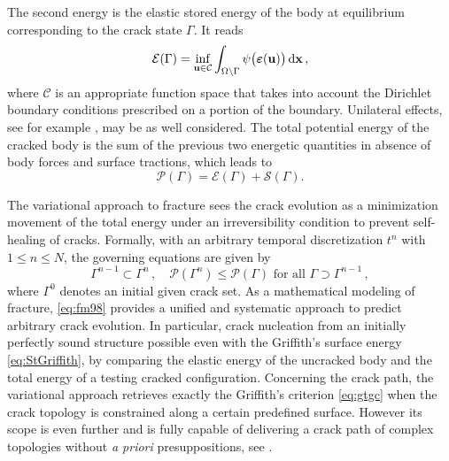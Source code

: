 The second energy is the elastic stored energy of the body at equilibrium corresponding to the crack state $\Gamma$. It reads
\begin{equation} \label{eq:EGamma}
\mathcal{E}(\Gamma)=\inf_{\vec{u}\in\mathcal{C}}\int_{\Omega\setminus\Gamma}\psi\bigl(\eps(\vec{u})\bigr)\dx\,,
\end{equation}
where $\mathcal{C}$ is an appropriate function space that takes into account the Dirichlet boundary conditions prescribed on a portion of the boundary. Unilateral effects, see for example \cite{FrancfortMarigo:1998,AmorMarigoMaurini:2009}, may be as well considered. The total potential energy of the cracked body is the sum of the previous two energetic quantities in absence of body forces and surface tractions, which leads to
\begin{equation} \label{eq:PES}
\mathcal{P}(\Gamma)=\mathcal{E}(\Gamma)+\mathcal{S}(\Gamma).
\end{equation}

The variational approach to fracture sees the crack evolution as a minimization movement of the total energy under an irreversibility condition to prevent self-healing of cracks. Formally, with an arbitrary temporal discretization $t^n$ with $1\leq n\leq N$, the governing equations are given by
\begin{equation} \label{eq:fm98}
\Gamma^{n-1}\subset\Gamma^n\,,\quad \mathcal{P}(\Gamma^n)\leq\mathcal{P}(\Gamma)\text{ for all $\Gamma\supset\Gamma^{n-1}$}\,,
\end{equation}
where $\Gamma^0$ denotes an initial given crack set. As a mathematical modeling of fracture, \eqref{eq:fm98} provides a unified and systematic approach to predict arbitrary crack evolution. In particular, crack nucleation from an initially perfectly sound structure possible even with the Griffith's surface energy \eqref{eq:StGriffith}, by comparing the elastic energy of the uncracked body and the total energy of a testing cracked configuration. Concerning the crack path, the variational approach retrieves exactly the Griffith's criterion \eqref{eq:gtgc} when the crack topology is constrained along a certain predefined surface. However its scope is even further and is fully capable of delivering a crack path of complex topologies without \emph{a priori} presuppositions, see \cite{BourdinFrancfortMarigo:2008}.

